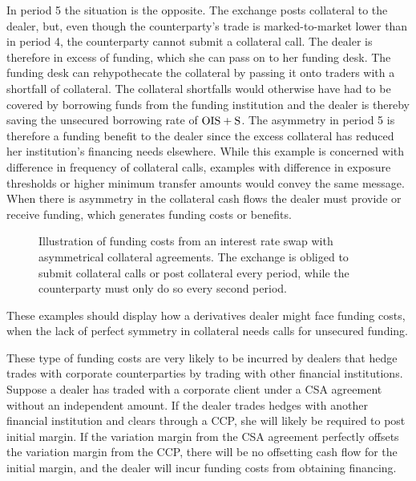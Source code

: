 \documentclass[main.tex]{subfiles}
\begin{document}
\begin{example}
        In period 5 the situation is the opposite.
        The exchange posts collateral to the dealer, 
        but, even though the counterparty's trade is marked-to-market lower than in period 4,
        the counterparty cannot submit a collateral call. 
        The dealer is therefore in excess of funding,
        which she can pass on to her funding desk.
        The funding desk can rehypothecate the collateral
        by passing it onto traders with a shortfall of collateral.
        The collateral shortfalls would otherwise have had to be covered by borrowing funds 
        from the funding institution and the dealer is thereby saving the unsecured borrowing rate of $\OIS/ + \text{S}$.
        The asymmetry in period 5 is therefore a funding benefit to the dealer
        since the excess collateral has reduced her institution's financing needs elsewhere.
        While this example is concerned with difference in frequency of collateral calls,
        examples with difference in exposure thresholds or higher minimum transfer amounts 
        would convey the same message.
        When there is asymmetry in the collateral cash flows the dealer must provide or receive funding,
        which generates funding costs or benefits.
        \end{example}

        \begin{figure}
            \centering
            \resizebox{\textwidth}{!}{%
            \begin{tikzpicture}
                
            \end{tikzpicture}        
            }   
            \caption{
                Illustration of funding costs from an interest rate swap with asymmetrical collateral agreements.
                The exchange is obliged to submit collateral calls or post collateral every period,
                while the counterparty must only do so every second period.
            }
            \label{fig:funding-costs-asymmetrical-csa}
        \end{figure}

        These examples should display how a derivatives dealer might face funding costs,
        when the lack of perfect symmetry in collateral needs calls for unsecured funding.

        These type of funding costs are very likely to be incurred by dealers that hedge 
        trades with corporate counterparties by trading with other financial institutions.
        Suppose a dealer has traded with a corporate client
        under a CSA agreement without an independent amount.
        If the dealer trades hedges with another financial institution and clears through a CCP, 
        she will likely be required to post initial margin. 
        If the variation margin from the CSA agreement 
        perfectly offsets the variation margin from the CCP, 
        there will be no offsetting cash flow for the initial margin,
        and the dealer will incur funding costs from obtaining financing.
        
\end{document}
